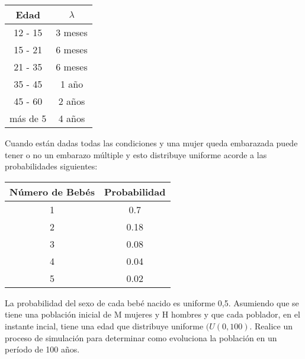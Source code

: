 \documentclass{article}
\begin{document}
            \begin{table}[h!]
                \begin{center}
                \begin{tabular}{| c | c |}
                \hline
                Edad & $ \lambda $ \\ \hline
                12 - 15  &  3 meses \\ \hline
                15 - 21  &  6 meses \\ \hline
                21 - 35  &  6 meses \\ \hline
                35 - 45  &  1 año \\ \hline
                45 - 60  &  2 años \\ \hline
                más de 5  &  4 años \\ \hline
                \end{tabular}
                \end{center}
            \end{table}

            Cuando están dadas todas las condiciones y una mujer queda embarazada
            puede tener o no un embarazo múltiple y esto distribuye uniforme acorde a las
            probabilidades siguientes:

            \begin{table}[h!]
                \begin{center}
                \begin{tabular}{| c | c |}
                \hline
                Número de Bebés & Probabilidad \\ \hline
                1  &  0.7 \\ \hline
                2  &  0.18 \\ \hline
                3  &  0.08 \\ \hline
                4  &  0.04 \\ \hline
                5  &  0.02 \\ \hline
                \end{tabular}
                \end{center}
            \end{table}

            La probabilidad del sexo de cada bebé nacido es uniforme 0,5.
            Asumiendo que se tiene una población inicial de M mujeres y H hombres y
            que cada poblador, en el instante incial, tiene una edad que distribuye uniforme
            $(U(0,100)$. Realice un proceso de simulación para determinar como evoluciona
            la población en un período de 100 años.
\end{document}
